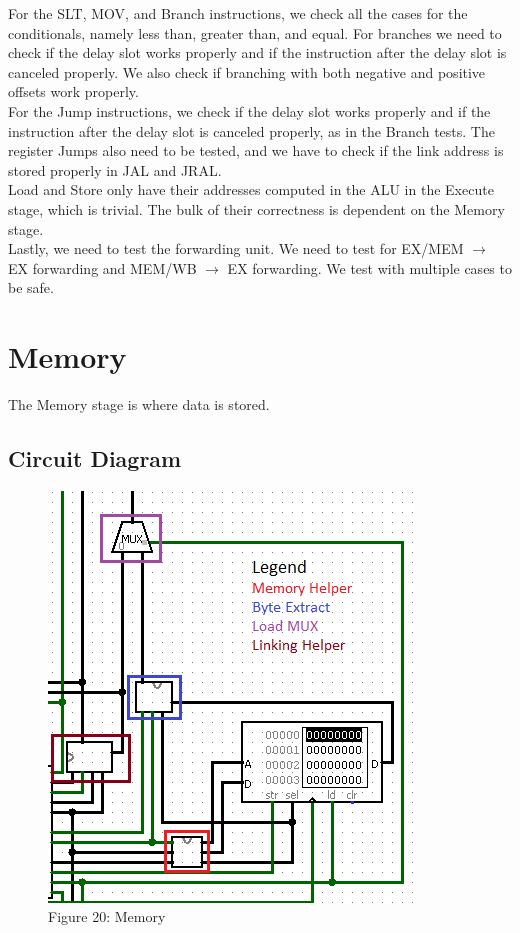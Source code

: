 \documentclass{article}
\begin{document}
\noindent For the SLT, MOV, and Branch instructions, we check all the cases for the conditionals, namely less than, greater than, and equal. For branches we need to check if the delay slot works properly and if the instruction after the delay slot is canceled properly. We also check if branching with both negative and positive offsets work properly. \vspace{-.2cm} \\

\noindent For the Jump instructions, we check if the delay slot works properly and if the instruction after the delay slot is canceled properly, as in the Branch tests. The register Jumps also need to be tested, and we have to check if the link address is stored properly in JAL and JRAL. \vspace{-.2cm} \\

\noindent Load and Store only have their addresses computed in the ALU in the Execute stage, which is trivial. The bulk of their correctness is dependent on the Memory stage. \vspace{-.2cm} \\

\noindent Lastly, we need to test the forwarding unit. We need to test for EX/MEM $\rightarrow$ EX forwarding and MEM/WB $\rightarrow$ EX forwarding. We test with multiple cases to be safe.  \vspace{-.2cm} \\

\section{Memory}
The Memory stage is where data is stored.
\subsection{Circuit Diagram}
\begin{figure}
\vspace{-3cm}
\begin{center}
\includegraphics[width=.4\textwidth]{MemOver.png} \\
Figure 20: Memory
\end{center}
\vspace{-2.5cm}
\end{figure}
\end{document}
